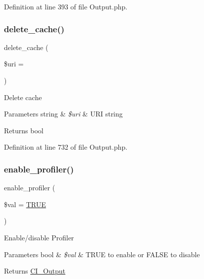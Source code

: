 Definition at line 393 of file Output.\+php.

\mbox{\label{class_c_i___output_a475c83a7e4d2f7162032c01279c161b4}} 
\subsubsection{\texorpdfstring{delete\_cache()}{delete\_cache()}}
{\footnotesize\ttfamily delete\+\_\+cache (\begin{DoxyParamCaption}\item[{}]{\$uri = {\ttfamily \textquotesingle{}\textquotesingle{}} }\end{DoxyParamCaption})}

Delete cache


\begin{DoxyParams}[1]{Parameters}
string & {\em \$uri} & U\+RI string \\
\hline
\end{DoxyParams}
\begin{DoxyReturn}{Returns}
bool 
\end{DoxyReturn}


Definition at line 732 of file Output.\+php.

\mbox{\label{class_c_i___output_a7bd693db25952e1b074630f52ee67500}} 
\subsubsection{\texorpdfstring{enable\_profiler()}{enable\_profiler()}}
{\footnotesize\ttfamily enable\+\_\+profiler (\begin{DoxyParamCaption}\item[{}]{\$val = {\ttfamily \mbox{\hyperlink{constants_8php_ae04a3efe6aa42044f803ee90c2277846}{T\+R\+UE}}} }\end{DoxyParamCaption})}

Enable/disable Profiler


\begin{DoxyParams}[1]{Parameters}
bool & {\em \$val} & T\+R\+UE to enable or F\+A\+L\+SE to disable \\
\hline
\end{DoxyParams}
\begin{DoxyReturn}{Returns}
\mbox{\hyperlink{class_c_i___output}{C\+I\+\_\+\+Output}} 
\end{DoxyReturn}


